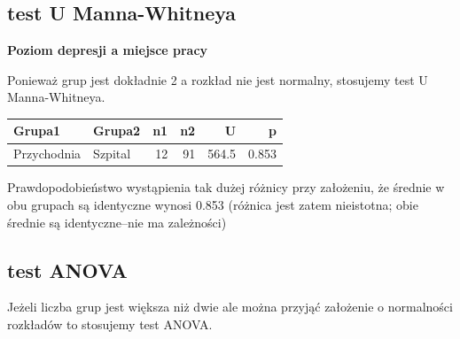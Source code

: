 \documentclass[
  openany]{book}
\begin{document}
\hypertarget{test-u-manna-whitneya}{%
\subsection{test U Manna-Whitneya}\label{test-u-manna-whitneya}}

\begin{example}
\textbf{Poziom depresji a miejsce pracy}

Ponieważ grup jest dokładnie 2 a rozkład nie jest normalny, stosujemy test U Manna-Whitneya.

\begin{tabular}{l|l|r|r|r|r}
\hline
Grupa1 & Grupa2 & n1 & n2 & U & p\\
\hline
Przychodnia & Szpital & 12 & 91 & 564.5 & 0.853\\
\hline
\end{tabular}

Prawdopodobieństwo wystąpienia tak dużej różnicy przy założeniu, że
średnie w obu grupach
są identyczne wynosi 0.853 (różnica jest zatem nieistotna; obie średnie są identyczne--nie ma zależności)
\end{example}

\hypertarget{test-anova}{%
\subsection{test ANOVA}\label{test-anova}}

Jeżeli liczba grup jest większa niż dwie ale można przyjąć założenie
o normalności rozkładów to stosujemy test ANOVA.
\end{document}
